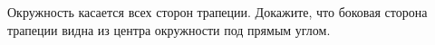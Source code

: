 \begin{ex}
	\begin{condition}
		Окружность касается всех сторон трапеции. Докажите, что боковая сторона трапеции видна из центра окружности	под прямым углом.
	\end{condition}
\end{ex}